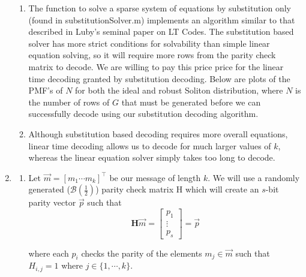 \documentclass[11pt]{article}
\begin{document}
\begin{enumerate}
\begin{enumerate}
        \item The function to solve a sparse system of equations by substitution only (found in substitutionSolver.m) implements an algorithm similar to that described in Luby's seminal paper on LT Codes. The substitution based solver has more strict conditions for solvability than simple linear equation solving, so it will require more rows from the parity check matrix to decode. We are willing to pay this price price for the linear time decoding granted by substitution decoding. Below are plots of the PMF's of $N$ for both the ideal and robust Soliton distribution, where $N$ is the number of rows of $G$ that must be generated before we can successfully decode using our substitution decoding algorithm.





        \item Although substitution based decoding requires more overall equations, linear time decoding allows us to decode for much larger values of $k$, whereas the linear equation solver simply takes too long to decode.




    \end{enumerate}
    \newpage




  \item
    \begin{enumerate}

        \item Let $\vec{m} = [m_1 \cdots m_k]^\top$ be our message of length $k$. We will use a randomly generated ($\mathcal{B}(\frac{1}{2})$) parity check matrix H which will create an $s$-bit parity vector $\vec{p}$ such that
        \begin{equation*}
        \textbf{H}\vec{m} = \begin{bmatrix}
            p_1 \\
            \vdots\\
            p_s
            \end{bmatrix} = \vec{p}
        \end{equation*}
        
        where each $p_i$ checks the parity of the elements $m_j \in \vec{m}$ such that $H_{i,j} = 1$ where $j \in \{1, \cdots, k\}$. \newline
        

\end{enumerate}
\end{enumerate}
\end{document}
